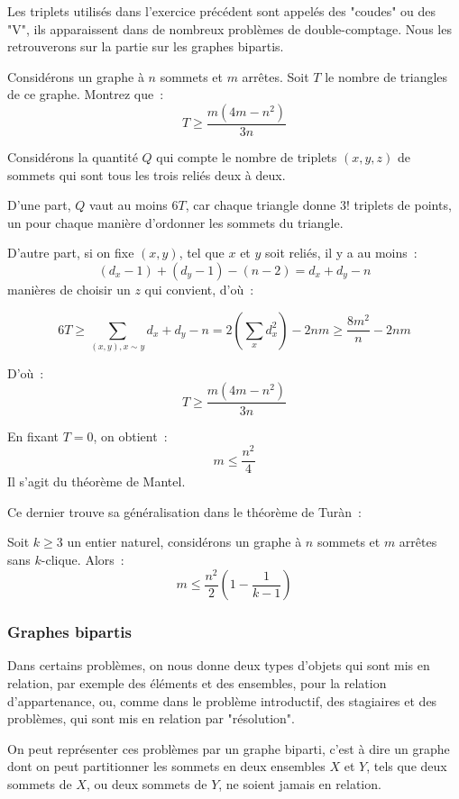 Les triplets utilisés dans l'exercice précédent sont appelés des "coudes" ou des "V", ils apparaissent dans de nombreux problèmes de double-comptage. Nous les retrouverons sur la partie sur les graphes bipartis.

\begin{exo}[APMO 1989]
	Considérons un graphe à $n$ sommets et $m$ arrêtes. Soit $T$ le nombre de triangles de ce graphe. Montrez que~:
	$$T \geq \frac{m(4m - n^2)}{3n}$$
\end{exo}
\begin{sol}
	Considérons la quantité $Q$ qui compte le nombre de triplets $(x, y, z)$ de sommets qui sont tous les trois reliés deux à deux.
	
	D'une part, $Q$ vaut au moins $6T$, car chaque triangle donne $3!$ triplets de points, un pour chaque manière d'ordonner les sommets du triangle.
	
	D'autre part, si on fixe $(x, y)$, tel que $x$ et $y$ soit reliés, il y a au moins~:
	$$(d_x - 1) + (d_y - 1) - (n - 2) = d_x + d_y - n$$
	manières de choisir un $z$ qui convient, d'où~:
	
	$$6T \geq \sum_{(x, y), x \sim y} d_x + d_y - n
	= 2\left ( \sum_x d_x^2 \right ) - 2nm
	\geq \frac{8m^2}{n} - 2nm$$
	
	D'où~:
	$$T \geq \frac{m(4m - n^2)}{3n}$$
\end{sol}

En fixant $T = 0$, on obtient~:
$$m \leq \frac{n^2}{4}$$
Il s'agit du théorème de Mantel.

Ce dernier trouve sa généralisation dans le théorème de Turàn~:
\begin{thm}
	Soit $k \geq 3$ un entier naturel, considérons un graphe à $n$ sommets et $m$ arrêtes sans $k$-clique. Alors~:
	$$m \leq \frac{n^2}2 \left (1 - \frac1{k - 1} \right )$$
\end{thm}

\subsubsection{Graphes bipartis}

Dans certains problèmes, on nous donne deux types d'objets qui sont mis en relation, par exemple des éléments et des ensembles, pour la relation d'appartenance, ou, comme dans le problème introductif, des stagiaires et des problèmes, qui sont mis en relation par "résolution".

On peut représenter ces problèmes par un graphe biparti, c'est à dire un graphe dont on peut partitionner les sommets en deux ensembles $X$ et $Y$, tels que deux sommets de $X$, ou deux sommets de $Y$, ne soient jamais en relation.

